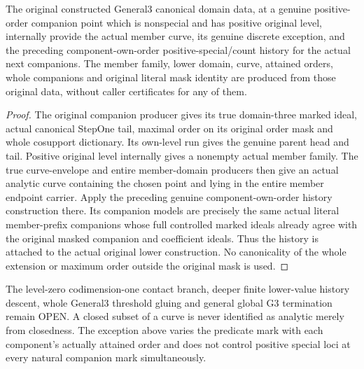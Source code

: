 \begin{theorem}
\label{hir:member-companion-positive-general-three-consumer}
\leanok
The original constructed General3 canonical domain data, at a genuine
positive-order companion point which is nonspecial and has positive original
level, internally provide the actual member curve, its genuine discrete
exception, and the preceding component-own-order positive-special/count
history for the actual next companions. The member family, lower domain,
curve, attained orders, whole companions and original literal mask identity
are produced from those original data, without caller certificates for any
of them.
\end{theorem}
\begin{proof}
The original companion producer gives its true domain-three marked ideal,
actual canonical StepOne tail, maximal order on its original order mask and
whole cosupport dictionary. Its own-level run gives the genuine parent head
and tail. Positive original level internally gives a nonempty actual member
family. The true curve-envelope and entire member-domain producers then give
an actual analytic curve containing the chosen point and lying in the entire
member endpoint carrier. Apply the preceding genuine component-own-order
history construction there. Its companion models are precisely the same
actual literal member-prefix companions whose full controlled marked ideals
already agree with the original masked companion and coefficient ideals.
Thus the history is attached to the actual original lower construction.
No canonicality of the whole extension or maximum order outside the original
mask is used.
\end{proof}

\begin{remark}
The level-zero codimension-one contact branch, deeper finite lower-value
history descent, whole General3 threshold gluing and general global G3
termination remain OPEN. A closed subset of a curve is never identified as
analytic merely from closedness. The exception above varies the predicate
mark with each component's actually attained order and does not control
positive special loci at every natural companion mark simultaneously.
\end{remark}
